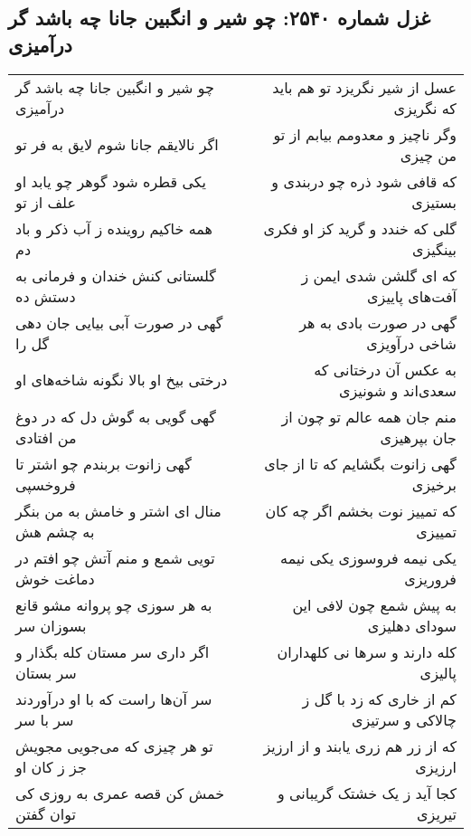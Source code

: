 \begin{center}
\section*{غزل شماره ۲۵۴۰: چو شیر و انگبین جانا چه باشد گر درآمیزی}
\label{sec:2540}
\begin{longtable}{l p{0.5cm} r}
چو شیر و انگبین جانا چه باشد گر درآمیزی
&&
عسل از شیر نگریزد تو هم باید که نگریزی
\\
اگر نالایقم جانا شوم لایق به فر تو
&&
وگر ناچیز و معدومم بیابم از تو من چیزی
\\
یکی قطره شود گوهر چو یابد او علف از تو
&&
که قافی شود ذره چو دربندی و بستیزی
\\
همه خاکیم روینده ز آب ذکر و باد دم
&&
گلی که خندد و گرید کز او فکری بینگیزی
\\
گلستانی کنش خندان و فرمانی به دستش ده
&&
که ای گلشن شدی ایمن ز آفت‌های پاییزی
\\
گهی در صورت آبی بیایی جان دهی گل را
&&
گهی در صورت بادی به هر شاخی درآویزی
\\
درختی بیخ او بالا نگونه شاخه‌های او
&&
به عکس آن درختانی که سعدی‌اند و شونیزی
\\
گهی گویی به گوش دل که در دوغ من افتادی
&&
منم جان همه عالم تو چون از جان بپرهیزی
\\
گهی زانوت بربندم چو اشتر تا فروخسپی
&&
گهی زانوت بگشایم که تا از جای برخیزی
\\
منال ای اشتر و خامش به من بنگر به چشم هش
&&
که تمییز نوت بخشم اگر چه کان تمییزی
\\
تویی شمع و منم آتش چو افتم در دماغت خوش
&&
یکی نیمه فروسوزی یکی نیمه فروریزی
\\
به هر سوزی چو پروانه مشو قانع بسوزان سر
&&
به پیش شمع چون لافی این سودای دهلیزی
\\
اگر داری سر مستان کله بگذار و سر بستان
&&
کله دارند و سرها نی کلهداران پالیزی
\\
سر آن‌ها راست که با او درآوردند سر با سر
&&
کم از خاری که زد با گل ز چالاکی و سرتیزی
\\
تو هر چیزی که می‌جویی مجویش جز ز کان او
&&
که از زر هم زری یابند و از ارزیز ارزیزی
\\
خمش کن قصه عمری به روزی کی توان گفتن
&&
کجا آید ز یک خشتک گریبانی و تیریزی
\\
\end{longtable}
\end{center}
